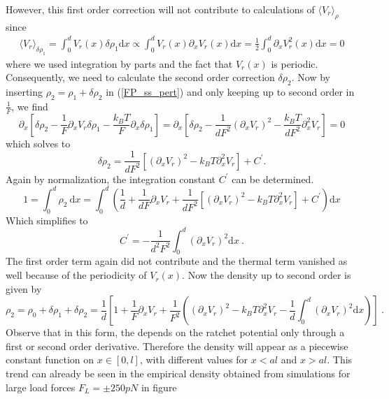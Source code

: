 \documentclass[aps,pre,onecolumn,showpacs,showkeys,a4paper]{revtex4}
\newcommand{\rmd}{{\mathrm d}}
\begin{document}
However, this first order correction will not contribute to calculations of $\langle V_r \rangle_\rho$ since
\begin{eqnarray}
\langle V_r \rangle_{\delta\rho_1} = \int_0^d V_r(x) \delta\rho_1 \rmd x\propto \int_0^d V_r(x)\partial_x V_r(x) \rmd x = \frac{1}{2}\int_0^d \partial_x V_r^2(x) \rmd x = 0
\end{eqnarray}
where we used integration by parts and the fact that $V_r(x)$ is periodic.
Consequently, we need to calculate the second order correction $\delta\rho_2$. Now by inserting $\rho_2 = \rho_1 + \delta\rho_2$ in (\ref{FP_ss_pert}) and only keeping up to second order in $\frac{1}{F}$, we find
 \begin{equation}
 \partial_x\left[\delta\rho_2-\frac{1}{F}\partial_x V_r\delta\rho_1 - \frac{k_B T}{F}\partial_x \delta\rho_1\right] =  \partial_x\left[\delta\rho_2-\frac{1}{dF^2}\left(\partial_x V_r\right)^2 - \frac{k_B T}{dF^2}\partial_x^2 V_r\right] = 0
 \end{equation}
which solves to
\begin{equation}
\delta\rho_2 = \frac{1}{dF^2}\left[\left(\partial_xV_r\right)^2 - k_B T \partial_x^2V_r\right] + C^\prime.
\end{equation}
Again by normalization, the integration constant $C^\prime$ can be determined.
\begin{equation}
1 = \int_0^d \rho_2\ \rmd x = \int_0^d \left(\frac{1}{d} + \frac{1}{dF}\partial_x V_r + \frac{1}{dF^2}\left[\left(\partial_xV_r\right)^2 - k_B T \partial_x^2V_r\right] + C^\prime\right) \rmd x 
\end{equation}
Which simplifies to
\begin{equation}
C^\prime = - \frac{1}{d^2F^2}\int_0^d\left(\partial_xV_r\right)^2 \rmd x\ . 
\end{equation}
The first order term again did not contribute and the thermal term vanished as well because of the periodicity of $V_r(x)$. Now the density up to second order is given by
\begin{equation}
\rho_2 = \rho_0 + \delta\rho_1 + \delta\rho_2 = \frac{1}{d}\left[1 + \frac{1}{F}\partial_x V_r + \frac{1}{F^2}\left(\left(\partial_xV_r\right)^2 - k_B T \partial_x^2V_r - \frac{1}{d}\int_0^d\left(\partial_xV_r\right)^2 \rmd x\right)\right] \ .
\end{equation}
Observe that in this form, the depends on the ratchet potential only through a first or second order derivative. Therefore the density will appear as a piecewise constant function on $x\in[0,l]$, with different values for $x<al$ and $x>al$. This trend can already be seen in the empirical density obtained from simulations for large load forces $F_L =\pm250 pN$ in figure\par
\end{document}

